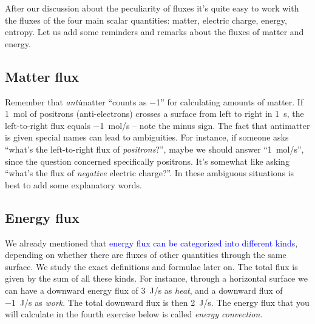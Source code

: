\documentclass[a4paper,12pt,%
onecolumn,oneside,titlepage,%
british%
]{memoir}
\renewcommand*{\|}[1][]{\nonscript\:#1\vert\nonscript\:\mathopen{}}
\newcommand*{\sect}{\S}%
\renewcommand*{\autoref}[2]{\sidepar{\vspace{-1ex}\footnotesize{\color{blue}\faIcon{%
reply%
}\enspace\sect\,\ref{#1} page\,\pageref{#1}}}\textcolor{blue}{#2}}
\begin{document}
\bigskip

After our discussion about the peculiarity of fluxes it's quite easy to work with the fluxes of the four main scalar quantities: matter, electric charge, energy, entropy. Let us add some reminders and remarks about the fluxes of matter and energy.


\subsection{Matter flux}
\label{sec:matter_flux}

Remember that \emph{anti}matter \enquote{counts as \num{-1}} for calculating amounts of matter. If \qty{1}{mol} of positrons (anti-electrons) crosses a surface from left to right in \qty{1}{s}, the left-to-right flux equals \qty{-1}{mol/s} -- note the minus sign. The fact that antimatter is given special names can lead to ambiguities. For instance, if someone asks \enquote{what's the left-to-right flux of \emph{positrons}?}, maybe we should answer \enquote{\qty{1}{mol/s}}, since the question concerned specifically positrons. It's somewhat like asking \enquote{what's the flux of \emph{negative} electric charge?}. In these ambiguous situations is best to add some explanatory words.

\subsection{Energy flux}
\label{sec:energy_flux}
We already mentioned that \autoref{sec:forms_energy}{energy flux can be categorized into different kinds}, depending on whether there are fluxes of other quantities through the same surface. We study the exact definitions and formulae later on. The total flux is given by the sum of all these kinds. For instance, through a horizontal surface we can have a downward energy flux of \qty{3}{J/s} as \emph{heat}, and a downward flux of \qty{-1}{J/s} as \emph{work}. The total downward flux is then \qty{2}{J/s}. The energy flux that you will calculate in the fourth exercise below is called \emph{energy convection}.
\end{document}
